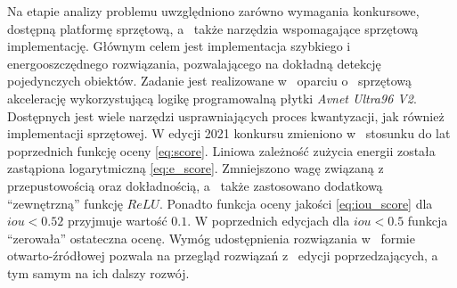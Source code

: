 Na etapie analizy problemu uwzględniono zarówno wymagania konkursowe, dostępną platformę sprzętową, a~ także  narzędzia wspomagające sprzętową implementację.
Głównym celem jest implementacja szybkiego i~ energooszczędnego rozwiązania, pozwalającego na dokładną detekcję pojedynczych obiektów. 
Zadanie jest realizowane w~ oparciu o~ sprzętową akcelerację wykorzystującą logikę programowalną płytki \emph{Avnet Ultra96 V2}.
Dostępnych jest wiele narzędzi usprawniających proces kwantyzacji, jak również implementacji sprzętowej.
W edycji 2021 konkursu zmieniono w~ stosunku do lat poprzednich funkcję oceny \eqref{eq:score}. Liniowa zależność zużycia energii została zastąpiona logarytmiczną \eqref{eq:e_score}. 
Zmniejszono wagę związaną z~ przepustowością oraz dokładnością, a~ także zastosowano dodatkową ``zewnętrzną'' funkcję $ReLU$. 
Ponadto funkcja oceny jakości \eqref{eq:iou_score} dla $iou < 0.52$ przyjmuje wartość $0.1$. 
W poprzednich edycjach dla $iou < 0.5$ funkcja ``zerowała'' ostateczna ocenę.   
Wymóg udostępnienia rozwiązania w~ formie otwarto-źródłowej pozwala na przegląd rozwiązań z~ edycji poprzedzających, a~ tym samym na ich dalszy rozwój.






    

